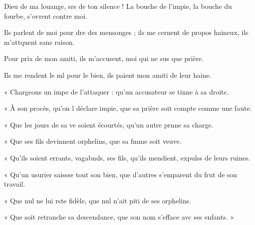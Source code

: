 \item Dieu de ma louange, srs de ton silence !\psstar{} La bouche de l'impie, la bouche du fourbe, s'ovrent contre moi.
\item Ils parlent de moi pour dre des mensonges ;\psstar{} ils me cernent de propos haineux, ils m'attquent sans raison.
\item Pour prix de mon amiti, ils m'accusent,\psstar{} moi qui ne sus que prière.
\item Ils me rendent le ml pour le bien,\psstar{} ils paient mon amiti de leur haine.
\item « Chargeons un impe de l'attaquer :\psstar{} qu'un accusateur se tinne à sa droite.
\item « À son procès, qu'on l déclare impie,\psstar{} que sa prière soit compte comme une faute.
\item « Que les jours de sa ve soient écourtés,\psstar{} qu'un autre prnne sa charge.
\item « Que ses fils devinnent orphelins,\psstar{} que sa fmme soit veuve.
\item « Qu'ils soient errants, vagabnds, ses fils,\psstar{} qu'ils mendient, expulss de leurs ruines.
\item « Qu'un usurier saissse tout son bien,\psstar{} que d'autres s'emparent du frut de son travail.
\item « Que nul ne lui rste fidèle,\psstar{} que nul n'ait piti de ses orphelins.
\item « Que soit retranche sa descendance, que son nom s'efface avc ses enfants. »